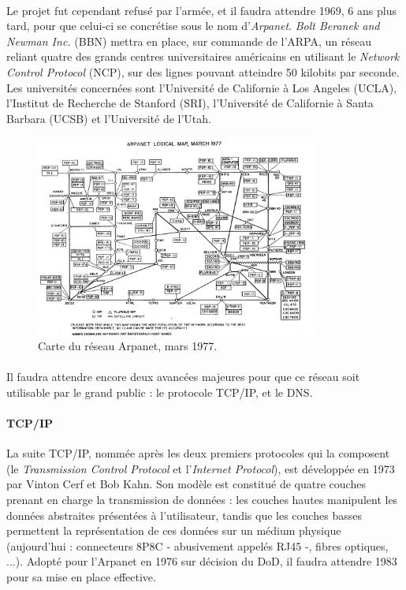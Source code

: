 \paragraph{} Le projet fut cependant refusé par l'armée, et il faudra attendre 1969, 6 ans plus tard, pour que celui-ci
se concrétise sous le nom d'\emph{Arpanet}. \emph{Bolt Beranek and Newman Inc.} (BBN) mettra en place, sur commande de
l'ARPA, un réseau reliant quatre des grands centres universitaires américains en utilisant le \emph{Network Control Protocol}
(NCP), sur des lignes pouvant atteindre 50 kilobits par seconde. Les universités concernées sont l'Université de Californie
à Los Angeles (UCLA), l'Institut de Recherche de Stanford (SRI), l'Université de Californie à Santa Barbara (UCSB) et
l'Université de l'Utah.

\begin{figure}[ht]
    \centering
    \includegraphics[width=350px]{chapters/01/images/arpanet_map.jpg}
    \caption{\label{arpanet}Carte du réseau Arpanet, mars 1977.}
\end{figure}

\paragraph{} Il faudra attendre encore deux avancées majeures pour que ce réseau soit utilisable par le grand public :
le protocole TCP/IP, et le DNS.

\paragraph{TCP/IP} La suite TCP/IP, nommée après les deux premiers protocoles qui la composent (le \emph{Transmission Control
Protocol} et l'\emph{Internet Protocol}), est développée en 1973 par Vinton Cerf et Bob Kahn. Son modèle est constitué de
quatre couches prenant en charge la transmission de données : les couches hautes manipulent les données abstraites
présentées à l'utilisateur, tandis que les couches basses permettent la représentation de ces données sur un médium
physique (aujourd'hui : connecteurs 8P8C - abusivement appelés RJ45 -, fibres optiques, ...). Adopté pour l'Arpanet en
1976 sur décision du DoD, il faudra attendre 1983 pour sa mise en place effective.


